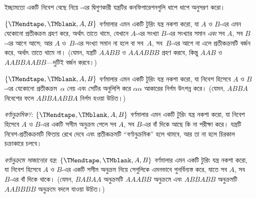 \documentclass[../../../include/open-logic-section]{subfiles}
\begin{document}
\begin{prob}
ইচ্ছামতো একটি নিবেশ বেছে নিয়ে -এর
দ্বিগুণকারী যন্ত্রটির কনফিগারেশনগুলি ধাপে ধাপে অনুসরণ করো।
\end{prob}

\begin{prob}
$\{\TMendtape,\TMblank, A, B\}$ বর্ণমালার এমন একটি টুরিং যন্ত্র নকশা
করো, যা $A$ ও $B$-এর এমন যেকোনো প্রতীকক্রম গ্রহণ করে, অর্থাৎ তাতে থামে,
যেখানে $A$-এর সংখ্যা $B$-এর সংখ্যার সমান \emph{এবং} সব $A$, সব $B$-এর
আগে আসে; আর $A$ ও~$B$-এর সংখ্যা সমান না হলে বা সব~$A$, সব~$B$-এর আগে
না এলে প্রতীকক্রমটি বর্জন করে, অর্থাৎ তাতে থামে না। (যেমন, যন্ত্রটি
$AABB$ ও $AAABBB$ গ্রহণ করবে, কিন্তু $AAB$ ও $AABBAABB$—দুটিই বর্জন
করবে।)
\end{prob}

\begin{prob}
$\{\TMendtape,\TMblank, A, B\}$ বর্ণমালার এমন একটি টুরিং যন্ত্র নকশা
করো, যা নিবেশ হিসেবে $A$ ও $B$-এর যেকোনো প্রতীকক্রম~$\alpha$ নেয় এবং
সেটির অনুলিপি করে $\alpha\alpha$ আকারের নির্গম উৎপন্ন করে। (যেমন,
$ABBA$ নিবেশের ফলে $ABBAABBA$ নির্গম হওয়া উচিত।)
\end{prob}

\begin{prob}
\emph{বর্ণানুক্রমিক?}: $\{\TMendtape,\TMblank, A, B\}$ বর্ণমালার এমন
একটি টুরিং যন্ত্র নকশা করো, যা নিবেশ হিসেবে $A$ ও $B$-এর একটি সসীম
অনুক্রম পেলে সব $A$, সব $B$-এর বাঁ দিকে আছে কি না পরীক্ষা করে। যন্ত্রটি
নিবেশ-প্রতীকক্রমটি ফিতায় রেখে দেবে এবং প্রতীকক্রমটি “বর্ণানুক্রমিক” হলে
থামবে, আর তা না হলে চিরকাল চক্রাকারে চলবে।
\end{prob}

\begin{prob}
\emph{বর্ণানুক্রমে সাজানোর যন্ত্র}: $\{\TMendtape,\TMblank, A, B\}$
বর্ণমালার এমন একটি টুরিং যন্ত্র নকশা করো, যা নিবেশ হিসেবে $A$ ও $B$-এর
একটি সসীম অনুক্রম নিয়ে সেগুলিকে এমনভাবে পুনর্বিন্যস্ত করে, যাতে সব $A$,
সব~$B$-এর বাঁ দিকে থাকে। (যেমন, $BABAA$ অনুক্রমটি $AAABB$ অনুক্রমে এবং
$ABBABB$ অনুক্রমটি $AABBBB$ অনুক্রমে বদলে যাওয়া উচিত।)
\end{prob}
\end{document}
